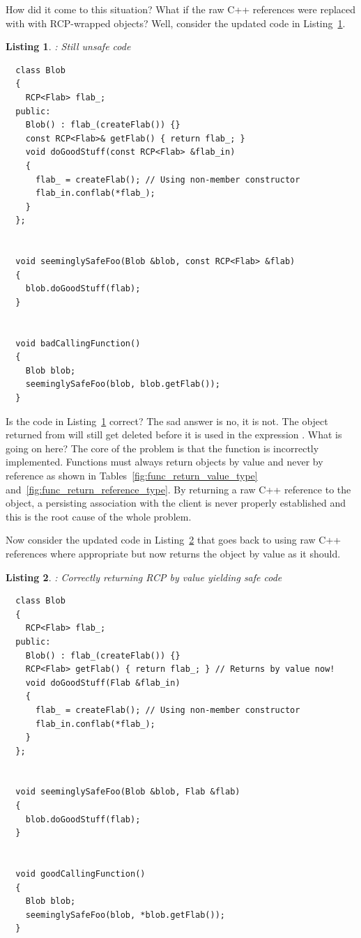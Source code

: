 \documentclass[pdf,ps2pdf,11pt]{SANDreport}
\newtheorem{listing}{Listing}
\begin{document}
How did it come to this situation?  What if the raw C++ references
were replaced with with RCP-wrapped objects?  Well, consider the
updated code in Listing~\ref{listing:unsafe_raw_C++_reference3}.

\begin{listing}: Still unsafe code  \\
\label{listing:unsafe_raw_C++_reference3}
{\small\begin{verbatim}
  class Blob
  {
    RCP<Flab> flab_;
  public:
    Blob() : flab_(createFlab()) {}
    const RCP<Flab>& getFlab() { return flab_; }
    void doGoodStuff(const RCP<Flab> &flab_in)
    {
      flab_ = createFlab(); // Using non-member constructor
      flab_in.conflab(*flab_);
    }
  };


  void seeminglySafeFoo(Blob &blob, const RCP<Flab> &flab)
  {
    blob.doGoodStuff(flab);
  }


  void badCallingFunction()
  {
    Blob blob;
    seeminglySafeFoo(blob, blob.getFlab());
  }
\end{verbatim}}
\end{listing}

Is the code in Listing~\ref{listing:unsafe_raw_C++_reference3}
correct?  The sad answer is no, it is not.  The {} object
returned from {} will still get deleted before it
is used in the expression {}.  What is
going on here?  The core of the problem is that the function
{} is incorrectly implemented.  Functions must
always return {} objects by value and never by reference as
shown in Tables~\ref{fig:func_return_value_type}
and~\ref{fig:func_return_reference_type}.  By returning a raw C++
reference to the {} object, a persisting association
with the client is never properly established and this is the root
cause of the whole problem.

Now consider the updated code in
Listing~\ref{listing:safe_raw_C++_reference3} that goes back to using
raw C++ references where appropriate but now returns the
{} object by value as it should.

\begin{listing}: Correctly returning RCP by value yielding safe code \\
\label{listing:safe_raw_C++_reference3}
{\small\begin{verbatim}
  class Blob
  {
    RCP<Flab> flab_;
  public:
    Blob() : flab_(createFlab()) {}
    RCP<Flab> getFlab() { return flab_; } // Returns by value now!
    void doGoodStuff(Flab &flab_in)
    {
      flab_ = createFlab(); // Using non-member constructor
      flab_in.conflab(*flab_);
    }
  };


  void seeminglySafeFoo(Blob &blob, Flab &flab)
  {
    blob.doGoodStuff(flab);
  }


  void goodCallingFunction()
  {
    Blob blob;
    seeminglySafeFoo(blob, *blob.getFlab());
  }
\end{verbatim}}
\end{listing}
\end{document}

